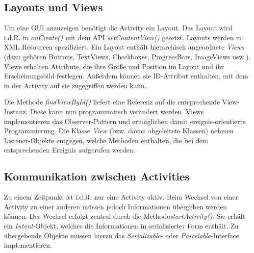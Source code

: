 \subsection{Layouts und Views}

Um eine GUI anzuzeigen benötigt die Activity ein Layout. Das Layout wird i.d.R. in \emph{onCreate()} mit dem API \emph{setContentView()} gesetzt. Layouts werden in XML Resourcen spezifiziert. Ein Layout enthält hierarchisch angeordnete \emph{Views} (dazu gehören Buttons, TextViews, Checkboxes, ProgressBars, ImageViews usw.). Views erhalten Attribute, die ihre Größe und Position im Layout und ihr Erscheinungsbild festlegen. Außerdem können sie ID-Attribut enthalten, mit dem in der Activity auf sie zugegriffen werden kann.

Die Methode \emph{findViewById()} liefert eine Referenz auf die entsprechende View-Instanz. Diese kann nun programmatisch verändert werden. Views implementieren das Observer-Pattern und ermöglichen damit ereignis-orientierte Programmierung. Die Klasse \emph{View} (bzw. davon abgeleitete Klassen) nehmen  Listener-Objekte entgegen, welche Methoden enthalten, die bei dem entsprechenden Ereignis aufgerufen werden.

\subsection{Kommunikation zwischen Activities}

Zu einem Zeitpunkt ist i.d.R. nur eine Activity aktiv. Beim Wechsel von einer Activity zu einer anderen müssen jedoch Informationen übergeben werden können. Der Wechsel erfolgt zentral durch die Methode\emph{startActivity()}. Sie erhält ein \emph{Intent}-Objekt, welches die Informationen in serialisierter Form enthält. Zu übergebende Objekte müssen hierzu das \emph{Serializable}- oder \emph{Parcelable}-Interface implementieren.

